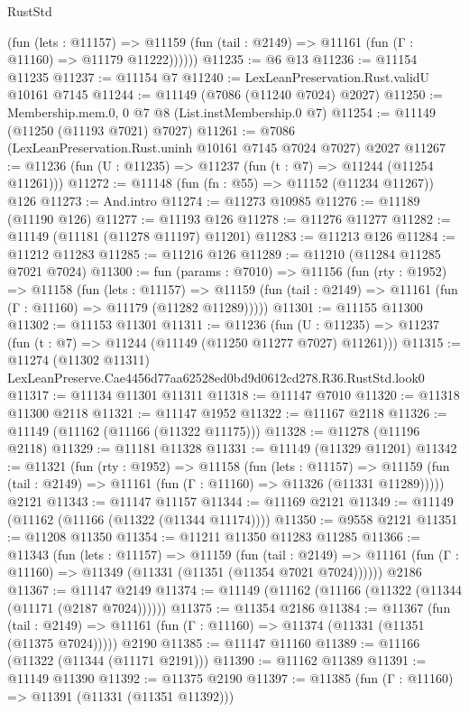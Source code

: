 \begin{lexlean}{RustStd}
\begin{coremodule}
          (fun (lets : @11157) =>
          @11159 (fun (tail : @2149) => @11161 (fun (Γ : @11160) => @11179 @11222))))))
@11235 := @6 @13
@11236 := @11154 @11235
@11237 := @11154 @7
@11240 := LexLeanPreservation.Rust.validU @10161 @7145
@11244 := @11149 (@7086 (@11240 @7024) @2027)
@11250 := Membership.mem.{0, 0} @7 @8 (List.instMembership.{0} @7)
@11254 := @11149 (@11250 (@11193 @7021) @7027)
@11261 := @7086 (LexLeanPreservation.Rust.uninh @10161 @7145 @7024 @7027) @2027
@11267 := @11236 (fun (U : @11235) => @11237 (fun (t : @7) => @11244 (@11254 @11261)))
@11272 := @11148 (fun (fn : @55) => @11152 (@11234 @11267)) @126
@11273 := And.intro
@11274 := @11273 @10985
@11276 := @11189 (@11190 @126)
@11277 := @11193 @126
@11278 := @11276 @11277
@11282 := @11149 (@11181 (@11278 @11197) @11201)
@11283 := @11213 @126
@11284 := @11212 @11283
@11285 := @11216 @126
@11289 := @11210 (@11284 @11285 @7021 @7024)
@11300 := fun (params : @7010) =>
  @11156
    (fun (rty : @1952) =>
    @11158
      (fun (lets : @11157) =>
      @11159 (fun (tail : @2149) => @11161 (fun (Γ : @11160) => @11179 (@11282 @11289)))))
@11301 := @11155 @11300
@11302 := @11153 @11301
@11311 := @11236
    (fun (U : @11235) => @11237 (fun (t : @7) => @11244 (@11149 (@11250 @11277 @7027) @11261)))
@11315 := @11274 (@11302 @11311) LexLeanPreserve.Cae4456d77aa62528ed0bd9d0612cd278.R36.RustStd.look0
@11317 := @11134 @11301 @11311
@11318 := @11147 @7010
@11320 := @11318 @11300 @2118
@11321 := @11147 @1952
@11322 := @11167 @2118
@11326 := @11149 (@11162 (@11166 (@11322 @11175)))
@11328 := @11278 (@11196 @2118)
@11329 := @11181 @11328
@11331 := @11149 (@11329 @11201)
@11342 := @11321
    (fun (rty : @1952) =>
    @11158
      (fun (lets : @11157) =>
      @11159 (fun (tail : @2149) => @11161 (fun (Γ : @11160) => @11326 (@11331 @11289)))))
    @2121
@11343 := @11147 @11157
@11344 := @11169 @2121
@11349 := @11149 (@11162 (@11166 (@11322 (@11344 @11174))))
@11350 := @9558 @2121
@11351 := @11208 @11350
@11354 := @11211 @11350 @11283 @11285
@11366 := @11343
    (fun (lets : @11157) =>
    @11159
      (fun (tail : @2149) =>
      @11161 (fun (Γ : @11160) => @11349 (@11331 (@11351 (@11354 @7021 @7024))))))
    @2186
@11367 := @11147 @2149
@11374 := @11149 (@11162 (@11166 (@11322 (@11344 (@11171 (@2187 @7024))))))
@11375 := @11354 @2186
@11384 := @11367
    (fun (tail : @2149) => @11161 (fun (Γ : @11160) => @11374 (@11331 (@11351 (@11375 @7024)))))
    @2190
@11385 := @11147 @11160
@11389 := @11166 (@11322 (@11344 (@11171 @2191)))
@11390 := @11162 @11389
@11391 := @11149 @11390
@11392 := @11375 @2190
@11397 := @11385 (fun (Γ : @11160) => @11391 (@11331 (@11351 @11392)))

\end{coremodule}
\end{lexlean}
